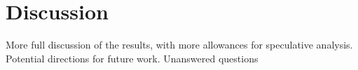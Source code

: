 \section*{Discussion}

More full discussion of the results, with more allowances for speculative
analysis.  Potential directions for future work.  Unanswered questions